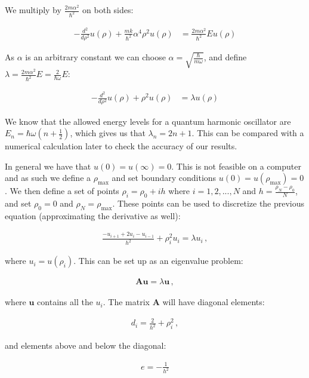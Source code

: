 \documentclass[reprint,english,notitlepage]{revtex4-1}  %
\begin{document}
We multiply by $\frac{2m\alpha^2}{\hbar^2}$ on both sides:

\begin{align*}
-\frac{d^2}{d\rho^2} u(\rho) + \frac{mk}{\hbar^2}\alpha^4 \rho^2 u(\rho) &= \frac{2m\alpha^2}{\hbar^2} Eu(\rho)
\end{align*}

As $\alpha$ is an arbitrary constant we can choose $\alpha = \sqrt{\frac{\hbar}{m \omega}}$, and define $\lambda = \frac{2m\alpha^2}{\hbar^2} E = \frac{2}{\hbar \omega} E$:

\begin{align*}
-\frac{d^2}{d\rho^2} u(\rho) + \rho^2 u(\rho) &= \lambda u(\rho)
\end{align*}

We know that the allowed energy levels for a quantum harmonic oscillator are $E_n = \hbar \omega (n + \frac{1}{2})$, which gives us that $\lambda_n = 2n+1$. This can be compared with a numerical calculation later to check the accuracy of our results.

In general we have that $u(0) = u(\infty) = 0$. This is not feasible on a computer and as such we define a $\rho_{\text{max}}$ and set boundary conditions $u(0) = u(\rho_{\text{max}}) = 0$. We then define a set of points $\rho_i = \rho_0 + ih$ where $i = 1,2,...,N$ and $h = \frac{\rho_N - \rho_0}{N}$, and set $\rho_0 = 0$ and $\rho_N  = \rho_{\text{max}}$. These points can be used to discretize the previous equation (approximating the derivative as well):

\begin{align*}
\frac{-u_{i+1} + 2u_i - u_{i-1}}{h^2} + \rho_i^2 u_i = \lambda u_i \, ,
\end{align*}

where $u_i = u(\rho_i)$. This can be set up as an eigenvalue problem:

\begin{align*}
\textbf{Au} = \lambda \textbf{u} \, ,
\end{align*}

where $\textbf{u}$ contains all the $u_i$. The matrix \textbf{A} will have diagonal elements:

\begin{align*}
d_i = \frac{2}{h^2} + \rho_i^2 \, ,
\end{align*}

and elements above and below the diagonal:

\begin{align*}
e = -\frac{1}{h^2}
\end{align*}
\end{document}
